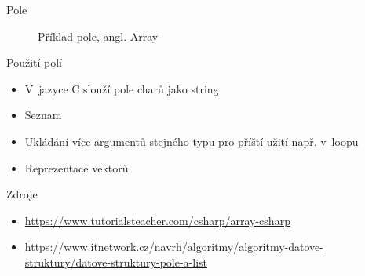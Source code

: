 \documentclass{beamer}
\begin{document}
\begin{frame}{Pole}
    \begin{figure}[h]
        \centering
        \caption{Příklad pole, angl. Array}
    \end{figure}
\end{frame}

\begin{frame}{Použití polí}
    \begin{itemize}
        \item V~jazyce C slouží pole charů jako string
        \item Seznam
        \item Ukládání více argumentů stejného typu pro příští užití např. v~loopu
        \item Reprezentace vektorů
    \end{itemize}
\end{frame}

\begin{frame}{Zdroje}
\begin{itemize}
    \item \href{https://www.tutorialsteacher.com/csharp/array-csharp}{https://www.tutorialsteacher.com/csharp/array-csharp}
    \item \href{https://www.itnetwork.cz/navrh/algoritmy/algoritmy-datove-struktury/datove-struktury-pole-a-list}{https://www.itnetwork.cz/navrh/algoritmy/algoritmy-datove-struktury/datove-struktury-pole-a-list}
\end{itemize}
\end{frame}
\end{document}
